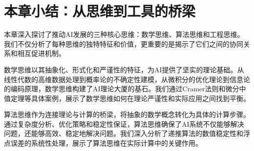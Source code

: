 %
%
%
%
%
%
%
%
%
%
%
%
%

\section{本章小结：从思维到工具的桥梁}

本章深入探讨了推动AI发展的三种核心思维：数学思维、算法思维和工程思维。我们不仅分析了每种思维的独特特征和价值，更重要的是揭示了它们之间的协同关系和相互促进机制。

数学思维以其抽象化、形式化和严谨性的特征，为AI提供了坚实的理论基础。从线性代数的高维数据处理到概率论的不确定性建模，从微积分的优化理论到信息论的编码原理，数学思维构建了AI理论大厦的基石。我们通过Cramer法则和微分中值定理等具体案例，展示了数学思维如何在理论严谨性和实际应用之间找到平衡。

算法思维作为连接理论与计算的桥梁，将抽象的数学概念转化为具体的计算步骤。通过复杂度分析、优化策略和稳定性保证，算法思维确保了AI系统不仅能够解决问题，还能够高效、稳定地解决问题。我们深入分析了递推算法的数值稳定性和浮点误差的系统性处理，展示了算法思维在实际计算中的关键作用。

